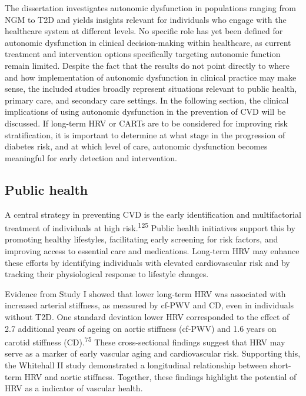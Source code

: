\documentclass[
  letterpaper,
  headsepline=true,
  open=any]{scrbook}
\begin{document}
The dissertation investigates autonomic dysfunction in populations
ranging from NGM to T2D and yields insights relevant for individuals who
engage with the healthcare system at different levels. No specific role
has yet been defined for autonomic dysfunction in clinical
decision-making within healthcare, as current treatment and intervention
options specifically targeting autonomic function remain limited.
Despite the fact that the results do not point directly to where and how
implementation of autonomic dysfunction in clinical practice may make
sense, the included studies broadly represent situations relevant to
public health, primary care, and secondary care settings. In the
following section, the clinical implications of using autonomic
dysfunction in the prevention of CVD will be discussed. If long-term HRV
or CARTs are to be considered for improving risk stratification, it is
important to determine at what stage in the progression of diabetes
risk, and at which level of care, autonomic dysfunction becomes
meaningful for early detection and intervention.

\hypertarget{public-health}{%
\subsection{Public health}\label{public-health}}

A central strategy in preventing CVD is the early identification and
multifactorial treatment of individuals at high
risk.\textsuperscript{125} Public health initiatives support this by
promoting healthy lifestyles, facilitating early screening for risk
factors, and improving access to essential care and medications.
Long-term HRV may enhance these efforts by identifying individuals with
elevated cardiovascular risk and by tracking their physiological
response to lifestyle changes.

Evidence from Study I showed that lower long-term HRV was associated
with increased arterial stiffness, as measured by cf-PWV and CD, even in
individuals without T2D. One standard deviation lower HRV corresponded
to the effect of 2.7 additional years of ageing on aortic stiffness
(cf-PWV) and 1.6 years on carotid stiffness (CD).\textsuperscript{75}
These cross-sectional findings suggest that HRV may serve as a marker of
early vascular aging and cardiovascular risk. Supporting this, the
Whitehall II study demonstrated a longitudinal relationship between
short-term HRV and aortic stiffness. Together, these findings highlight
the potential of HRV as a indicator of vascular health.
\end{document}
